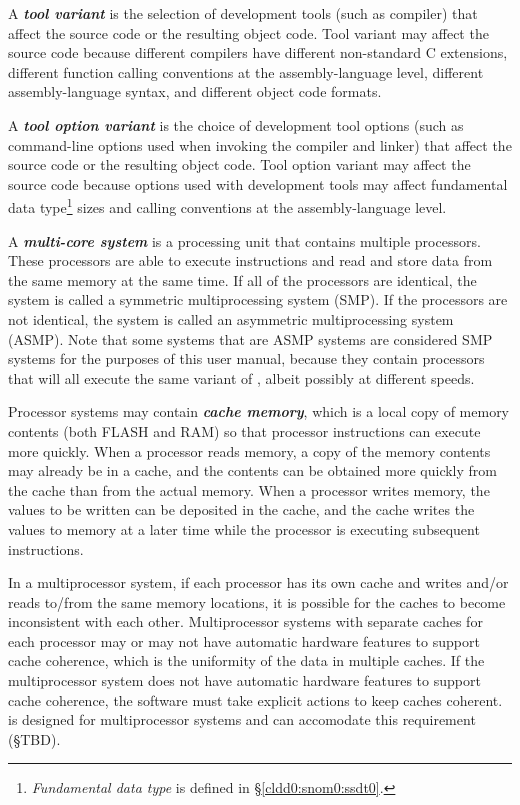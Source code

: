 A \emph{\textbf{tool variant}} is the selection
of development tools (such as compiler) that affect the
\emph{\productbasenameshort{}} source code or the resulting
object code.  Tool variant may affect the \emph{\productbasenameshort{}}
source code because different compilers have different non-standard
C extensions, different function calling conventions at the
assembly-language level, different assembly-language syntax, and different
object code formats.

A \emph{\textbf{tool option variant}}
is the choice of development tool options (such as command-line options used
when invoking the compiler and linker) that affect the
\emph{\productbasenameshort{}} source code or the resulting
object code.  Tool option variant may affect the \emph{\productbasenameshort{}}
source code because options used with development tools may
affect fundamental data type\footnote{\emph{Fundamental data type}
is defined in \S{}\ref{cldd0:snom0:ssdt0}.} sizes and calling conventions at the
assembly-language level.

A \emph{\textbf{multi-core system}}
is a processing unit that contains multiple processors.
These processors are able to execute instructions and read and store data
from the same memory at the same time.  If all of the processors are
identical, the system is called a symmetric multiprocessing system
(SMP).  If the processors are not identical, the system is called an
asymmetric multiprocessing system (ASMP).  
Note that some systems that are
ASMP systems are considered SMP systems for the purposes of this user
manual, because they contain processors that will all execute the same
variant of \emph{\productbasenameshort{}},
albeit possibly at different speeds.

Processor systems may contain \emph{\textbf{cache memory}},
which is a local copy of memory contents (both FLASH and RAM) so that
processor instructions can execute more quickly.  When a processor reads
memory, a copy of the memory contents may already be in a cache, and
the contents can be obtained more quickly from the cache than from
the actual memory.  When a processor writes memory, the values to
be written can be deposited in the cache, and the cache writes
the values to memory at a later time while the processor is
executing subsequent instructions.

In a multiprocessor system, if each processor has its own cache
and writes and/or reads to/from the same memory locations, it is possible
for the caches to become inconsistent with each other.
Multiprocessor systems with separate caches for each
processor may or may not have automatic hardware features to
support cache coherence, which is the uniformity of the data
in multiple caches.  If the multiprocessor system does not
have automatic hardware features to support cache coherence,
the software must take explicit actions to keep caches coherent.
\emph{\productbasenameshort{}} is designed for multiprocessor systems
and can accomodate this requirement (\S{}TBD).

